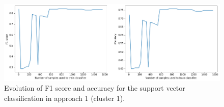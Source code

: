 \documentclass[sigplan,screen]{acmart}
\begin{document}
\begin{figure}[h]
    \centering
    \includegraphics[width=\linewidth]{reports/figures/A1_classification_svc_cluster1.png}
    \caption{Evolution of F1 score and accuracy for the support vector classification in approach 1 (cluster 1).}
    \label{fig:A1_classification_svc_cluster1}
\end{figure}
\end{document}
